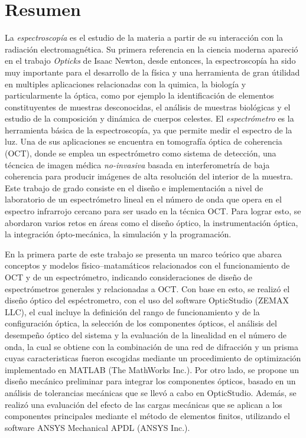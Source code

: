 
\newpage

\chapter*{\centering Resumen}

La \textit{espectroscopía} es el estudio de la materia a partir de su interacción con la radiación electromagnética. Su primera referencia en la ciencia moderna apareció en el trabajo \textit{Opticks} de Isaac Newton, desde entonces, la espectroscopía ha sido muy importante para el desarrollo de la física y una herramienta de gran útilidad en multiples aplicaciones relacionadas con la quimica, la biología y particularmente la óptica, como por ejemplo la identificación de elementos constituyentes de muestras desconocidas, el análisis de muestras biológicas y el estudio de la composición y dinámica de cuerpos celestes. El \textit{espectrómetro} es la herramienta básica de la espectroscopía, ya que permite medir el espectro de la luz. Una de sus aplicaciones se encuentra en tomografía óptica de coherencia (OCT), donde se emplea un espectrómetro como sistema de detección, una técncica de imagen médica \textit{no-invasiva} basada en interferometría de baja coherencia para producir imágenes de alta resolución del interior de la muestra. Este trabajo de grado consiste en el diseño e implementación a nivel de laboratorio de un espectrómetro lineal en el número de onda que opera en el espectro infrarrojo cercano para ser usado en la técnica OCT. Para lograr esto, se abordaron varios retos en áreas como el diseño óptico, la instrumentación óptica, la integración ópto-mecánica, la simulación y la programación.

En la primera parte de este trabajo se presenta un marco teórico que abarca conceptos y modelos físico--matamáticos relacionados con el funcionamiento de OCT y de un espectrómetro, indicando consideraciones de diseño de espectrómetros generales y relacionadas a OCT. Con base en esto, se realizó el diseño óptico del espéctrometro, con el uso del software OpticStudio (ZEMAX LLC), el cual incluye la definición del rango de funcionamiento y de la configuración óptica, la selección de los componentes ópticos, el análisis del desempeño óptico del sistema y la evaluación de la linealidad en el número de onda, la cual se obtiene con la combinación de una red de difracción y un prisma cuyas caracteristicas fueron escogidas mediante un procedimiento de optimización implementado en MATLAB (The MathWorks Inc.). Por otro lado, se propone un diseño mecánico preliminar para integrar los componentes ópticos, basado en un análisis de tolerancias mecánicas que se llevó a cabo en OpticStudio. Además, se realizó una evaluación del efecto de las cargas mecánicas que se aplican a los componentes principales mediante el método de elementos finitos, utilizando el software ANSYS Mechanical APDL (ANSYS Inc.).

